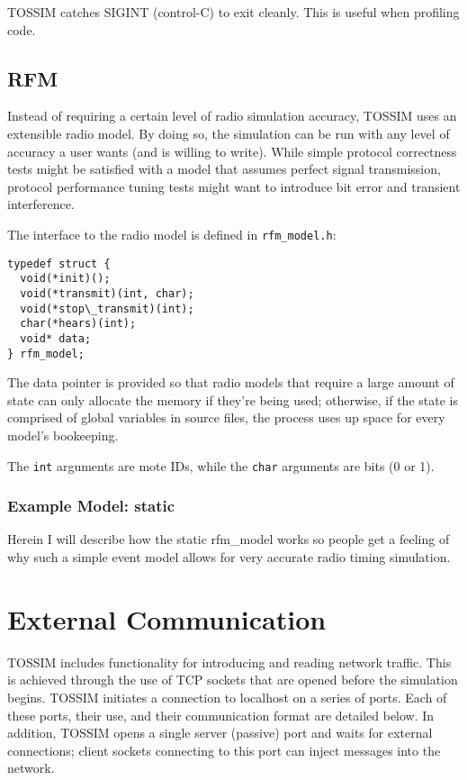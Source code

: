\documentclass[12pt]{article}
\begin{document}
TOSSIM catches SIGINT (control-C) to exit cleanly. This is useful when
profiling code.


\subsection*{RFM}

Instead of requiring a certain level of radio simulation accuracy,
TOSSIM uses an extensible radio model. By doing so, the simulation can
be run with any level of accuracy a user wants (and is willing to
write). While simple protocol correctness tests might be satisfied
with a model that assumes perfect signal transmission, protocol
performance tuning tests might want to introduce bit error and
transient interference.

The interface to the radio model is defined in {\tt rfm\_model.h}:

\begin{verbatim}
typedef struct {
  void(*init)();
  void(*transmit)(int, char);
  void(*stop\_transmit)(int);
  char(*hears)(int);
  void* data;
} rfm_model;
\end{verbatim}

The data pointer is provided so that radio models that require a large
amount of state can only allocate the memory if they're being used;
otherwise, if the state is comprised of global variables in source
files, the process uses up space for every model's bookeeping.

The {\tt int} arguments are mote IDs, while the {\tt char} arguments
are bits (0 or 1).

\subsubsection*{Example Model: static}

Herein I will describe how the static rfm\_model works so people get a
feeling of why such a simple event model allows for very accurate
radio timing simulation.


\section*{External Communication}

TOSSIM includes functionality for introducing and reading network
traffic. This is achieved through the use of TCP sockets that are
opened before the simulation begins. TOSSIM initiates a connection to
localhost on a series of ports. Each of these ports, their use, and
their communication format are detailed below. In addition, TOSSIM
opens a single server (passive) port and waits for external
connections; client sockets connecting to this port can inject
messages into the network.
\end{document}
